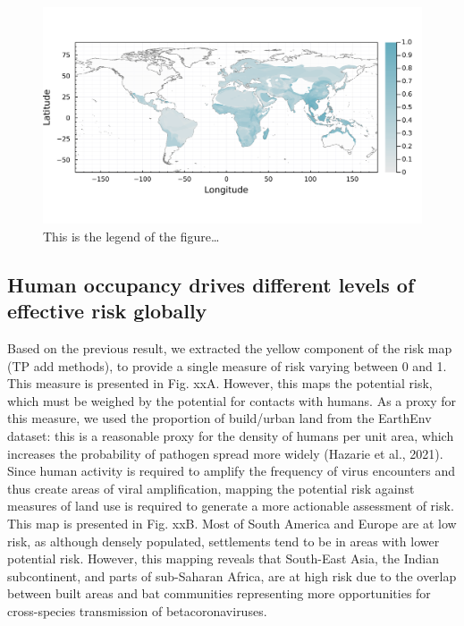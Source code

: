 \documentclass[11pt]{article}
\makeatletter
\def\maxwidth{\ifdim\Gin@nat@width>\linewidth\linewidth
\else\Gin@nat@width\fi}
\let\Oldincludegraphics\includegraphics
\renewcommand{\includegraphics}[1]{\Oldincludegraphics[width=\maxwidth]{#1}}
\makeatother
\begin{document}
\begin{figure}
\hypertarget{fig:risk}{%
\centering
\includegraphics{figures/risk_map.png}
\caption{This is the legend of the figure\ldots{}}\label{fig:risk}
}
\end{figure}

\hypertarget{human-occupancy-drives-different-levels-of-effective-risk-globally}{%
\subsection{Human occupancy drives different levels of effective risk
globally}\label{human-occupancy-drives-different-levels-of-effective-risk-globally}}

Based on the previous result, we extracted the yellow component of the
risk map (TP add methods), to provide a single measure of risk varying
between 0 and 1. This measure is presented in Fig. xxA. However, this
maps the potential risk, which must be weighed by the potential for
contacts with humans. As a proxy for this measure, we used the
proportion of build/urban land from the EarthEnv dataset: this is a
reasonable proxy for the density of humans per unit area, which
increases the probability of pathogen spread more widely (Hazarie et
al., 2021). Since human activity is required to amplify the frequency of
virus encounters and thus create areas of viral amplification, mapping
the potential risk against measures of land use is required to generate
a more actionable assessment of risk. This map is presented in Fig. xxB.
Most of South America and Europe are at low risk, as although densely
populated, settlements tend to be in areas with lower potential risk.
However, this mapping reveals that South-East Asia, the Indian
subcontinent, and parts of sub-Saharan Africa, are at high risk due to
the overlap between built areas and bat communities representing more
opportunities for cross-species transmission of betacoronaviruses.
\end{document}
